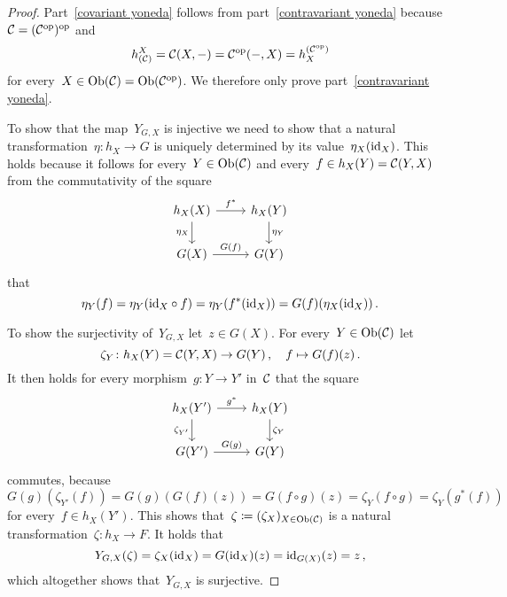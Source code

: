\begin{proof}
  Part~\ref*{covariant yoneda} follows from part~\ref*{contravariant yoneda} because~$\mathcal{C} = (\mathcal{C}^{\mathrm{op}})^{\mathrm{op}}$ and
  \[
      h^X_{(\mathcal{C})}
    = \mathcal{C}(X,-)
    = \mathcal{C}^{\mathrm{op}}(-,X)
    = h_X^{(\mathcal{C}^{\mathrm{op}})}
  \]
  for every~$X \in \operatorname{Ob}(\mathcal{C}) = \operatorname{Ob}(\mathcal{C}^{\mathrm{op}})$.
  We therefore only prove part~\ref*{contravariant yoneda}.
  
  To show that the map~$Y_{G,X}$ is injective we need to show that a natural transformation~$\eta \colon h_X \to G$ is uniquely determined by its value~$\eta_X(\operatorname{id}_X)$.
  This holds because it follows for every~$Y \in \operatorname{Ob}(\mathcal{C})$ and every~$f \in h_X(Y) = \mathcal{C}(Y,X)$ from the commutativity of the square
  \[
    \begin{tikzcd}
        h_X(X)
        \arrow{r}[above]{f^*}
        \arrow{d}[left]{\eta_X}
      & h_X(Y)
        \arrow{d}[right]{\eta_Y}
      \\
        G(X)
        \arrow{r}[above]{G(f)}
      & G(Y)
    \end{tikzcd}
  \]
  that
  \[
      \eta_Y(f)
    = \eta_Y({\operatorname{id}_X} \circ f)
    = \eta_Y(f^*(\operatorname{id}_X))
    = G(f)(\eta_X(\operatorname{id}_X)) \,.
  \]
  
  To show the surjectivity of~$Y_{G,X}$ let~$z \in G(X)$.
  For every~$Y \in \operatorname{Ob}(\mathcal{C})$ let
  \[
            \zeta_Y
    \colon  h_X(Y)
    =       \mathcal{C}(Y,X)
    \to     G(Y) \,,
    \quad   f
    \mapsto G(f)(z) \,.
  \]
  It then holds for every morphism~$g \colon Y \to Y'$ in~$\mathcal{C}$ that the square
  \[
    \begin{tikzcd}
        h_X(Y')
        \arrow{r}[above]{g^*}
        \arrow{d}[left]{\zeta_{Y'}}
      & h_X(Y)
        \arrow{d}[right]{\zeta_Y}
      \\
        G(Y')
        \arrow{r}[above]{G(g)}
      & G(Y)
    \end{tikzcd}
  \]
  commutes, because
  \[
      G(g)( \zeta_{Y'}( f ) )
    = G(g)( G(f)(z) )
    = G(f \circ g)(z)
    = \zeta_Y(f \circ g)
    = \zeta_Y( g^*(f) )
  \]
  for every~$f \in h_X(Y')$.
  This shows that~$\zeta \coloneqq (\zeta_X)_{X \in \operatorname{Ob}(\mathcal{C})}$ is a natural transformation~$\zeta \colon h_X \to F$.
  It holds that
  \[
      Y_{G,X}(\zeta)
    = \zeta_X(\operatorname{id}_X)
    = G(\operatorname{id}_X)(z)
    = \operatorname{id}_{G(X)}(z)
    = z \,,
  \]
  which altogether shows that~$Y_{G,X}$ is surjective.
\end{proof}


